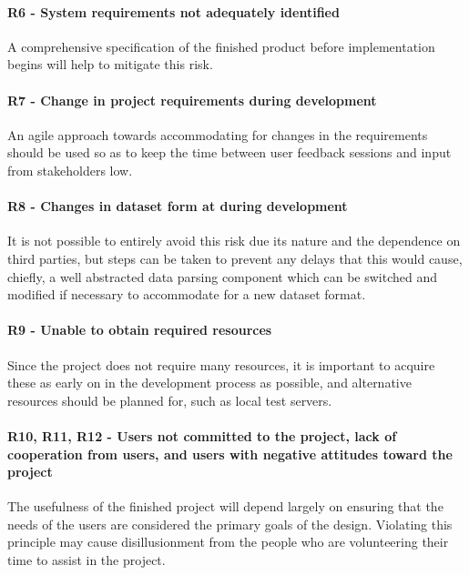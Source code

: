 \paragraph{R6 - System requirements not adequately identified} A
comprehensive specification of the finished product before
implementation begins will help to mitigate this risk.

\paragraph{R7 - Change in project requirements during development}
An agile approach towards accommodating for changes in the
requirements should be used so as to keep the time between user
feedback sessions and input from stakeholders low.

\paragraph{R8 - Changes in dataset form at during development} It is
not possible to entirely avoid this risk due its nature and the
dependence on third parties, but steps can be taken to prevent any
delays that this would cause, chiefly, a well abstracted data parsing
component which can be switched and modified if necessary to
accommodate for a new dataset format.

\paragraph{R9 - Unable to obtain required resources} Since the
project does not require many resources, it is important to acquire
these as early on in the development process as possible, and
alternative resources should be planned for, such as local test
servers.

\paragraph{R10, R11, R12 - Users not committed to the project, lack
of cooperation from users, and users with negative attitudes toward
the project} The usefulness of the finished project will depend
largely on ensuring that the needs of the users are considered the
primary goals of the design. Violating this principle may cause
disillusionment from the people who are volunteering their time to
assist in the project.

